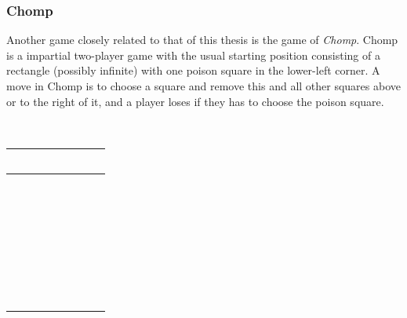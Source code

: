 \subsubsection{Chomp}
\label{section:chomp}
\begin{minipage}[b]{0.5\textwidth}
Another game closely related to that of this thesis is the game of \emph{Chomp}. Chomp is a impartial two-player game with the usual starting position consisting of a rectangle (possibly infinite) with one poison square in the lower-left corner. A move in Chomp is to choose a square and remove this and all other squares above or to the right of it, and a player loses if they has to choose the poison square.
\end{minipage}
\begin{minipage}{0.05\textwidth}
~
\end{minipage}
\begin{minipage}[b]{0.45\textwidth}
\centering
\begin{tabular}{ | c | c | c | c | c |}
\hline
~&~&~&~&~\\
\hline
~&~&~&~&~\\
\hline
~&~&~&~&~\\
\hline
~&~&~&~&~\\
\hline
~&~&~&~&~\\
\hline
~&~&~&~&~\\
\hline
\cellcolor{red}&~&~&~&~\\
\hline
\end{tabular}
\label{fig:chompstart}
\end{minipage}
